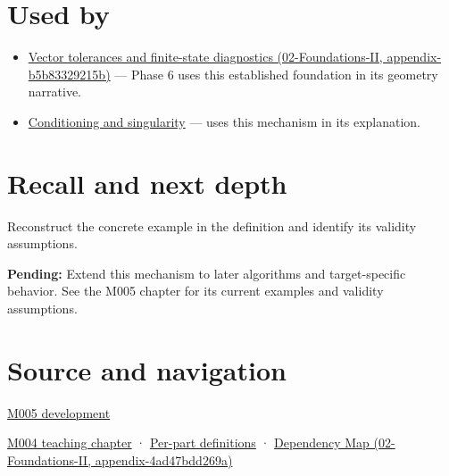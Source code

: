 \section{Used by}\label{appendix-0ec599f8ba27-used-by}

\begin{itemize}
\item
  \href{../02-Foundations-II/main.pdf\#nameddest=appendix-b5b83329215b}{Vector tolerances and finite-state diagnostics (02-Foundations-II, appendix-b5b83329215b)} --- Phase 6 uses this established foundation in its geometry narrative.
\item
  \hyperref[appendix-8f6a01f284a7]{Conditioning and singularity} --- uses this mechanism in its explanation.
\end{itemize}

\section{Recall and next depth}\label{appendix-0ec599f8ba27-recall-and-next-depth}

Reconstruct the concrete example in the definition and identify its validity assumptions.

\textbf{Pending:} Extend this mechanism to later algorithms and target-specific behavior. See the M005 chapter for its current examples and validity assumptions.

\section{Source and navigation}\label{appendix-0ec599f8ba27-source-and-navigation}

\href{Continuous\%20Notes/Computing\%20Foundations\%20-\%20From\%20Bits\%20to\%20C++\%20and\%20Systems\%20APIs\#When\%20arithmetic\%20meets\%20uncertainty}{M005 development}

\href{Continuous\%20Notes/Computing\%20Foundations\%20-\%20From\%20Bits\%20to\%20C++\%20and\%20Systems\%20APIs\#A\%20stretching\%20ruler\%20for\%20real-valued\%20quantities}{M004 teaching chapter} · \hyperref[appendix-fd090d982a15-m004---parts-61-76]{Per-part definitions} · \href{../02-Foundations-II/main.pdf\#nameddest=appendix-4ad47bdd269a}{Dependency Map (02-Foundations-II, appendix-4ad47bdd269a)}
